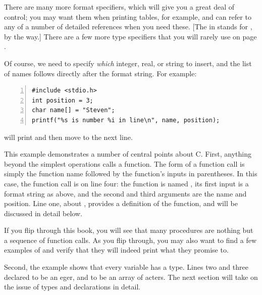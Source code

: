 There are many more format specifiers, which will give you a great deal
of control; you may want them when printing tables, for example, and can
refer to any of a number of detailed references when you need these. [The
 in  stands for , by the way.]
There are a few more type specifiers that you will rarely use on page
\pageref{printftwo}.

Of course, we need to specify {\sl which} integer, real, or string to insert, and the list of names
follows directly after the format string. For example:
\begin{lstlisting}[numbers=left, numberstyle=\scshape]
#include <stdio.h>
int position = 3;
char name[] = "Steven";
printf("%s is number %i in line\n", name, position);
\end{lstlisting}
will print  and then move to the next
line.

This example demonstrates a number of central points about C. First, anything
beyond the simplest operations calls a function. The form of a function
call is simply the function name followed by the function's inputs in
parentheses.  In this case, the
function call is on line four: the function is named , its first
input is a format string as above, and the second and third arguments
are the name and position. Line one, about , provides a
definition of the  function, and will be discussed in detail
below.

If you flip through this book, you will see that
many procedures are nothing but a sequence of function calls. As you
flip through, you may
also want to find a few examples of  and
verify that they will indeed print what they promise to.

Second, the example shows that every variable has a type. Lines two and
three declared  to be an eger, and  to be an
array of acters. The next section will take on the issue of
types and declarations in detail.




